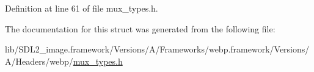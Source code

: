 Definition at line 61 of file mux\+\_\+types.\+h.



The documentation for this struct was generated from the following file\+:\begin{DoxyCompactItemize}
\item 
lib/\+S\+D\+L2\+\_\+image.\+framework/\+Versions/\+A/\+Frameworks/webp.\+framework/\+Versions/\+A/\+Headers/webp/\mbox{\hyperlink{mux__types_8h}{mux\+\_\+types.\+h}}\end{DoxyCompactItemize}
